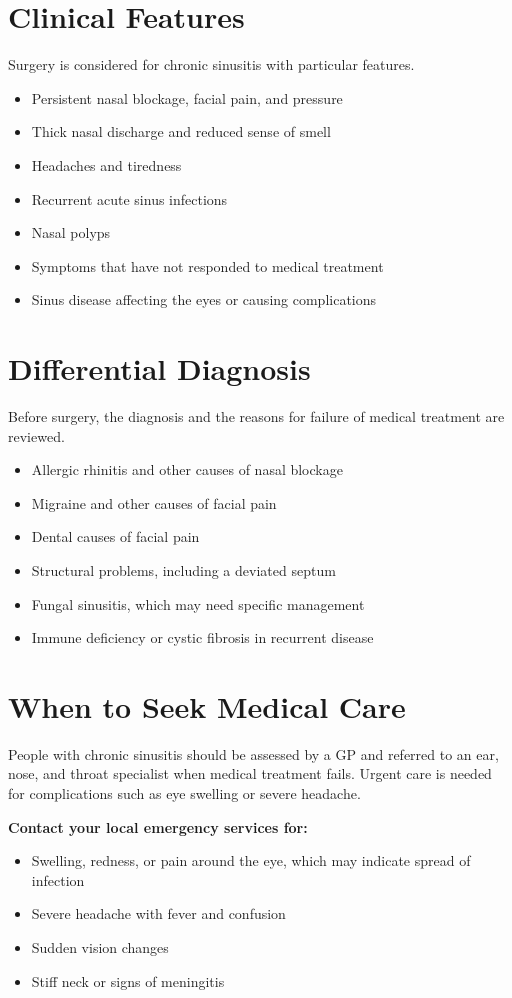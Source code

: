 \section*{Clinical Features}
Surgery is considered for chronic sinusitis with particular features.
\begin{itemize}
    \item Persistent nasal blockage, facial pain, and pressure
    \item Thick nasal discharge and reduced sense of smell
    \item Headaches and tiredness
    \item Recurrent acute sinus infections
    \item Nasal polyps
    \item Symptoms that have not responded to medical treatment
    \item Sinus disease affecting the eyes or causing complications
\end{itemize}

\section*{Differential Diagnosis}
Before surgery, the diagnosis and the reasons for failure of medical treatment are reviewed.
\begin{itemize}
    \item Allergic rhinitis and other causes of nasal blockage
    \item Migraine and other causes of facial pain
    \item Dental causes of facial pain
    \item Structural problems, including a deviated septum
    \item Fungal sinusitis, which may need specific management
    \item Immune deficiency or cystic fibrosis in recurrent disease
\end{itemize}

\section*{When to Seek Medical Care}
People with chronic sinusitis should be assessed by a GP and referred to an ear, nose, and throat specialist when medical treatment fails. Urgent care is needed for complications such as eye swelling or severe headache.

\textbf{Contact your local emergency services for:}
\begin{itemize}
    \item Swelling, redness, or pain around the eye, which may indicate spread of infection
    \item Severe headache with fever and confusion
    \item Sudden vision changes
    \item Stiff neck or signs of meningitis
\end{itemize}


